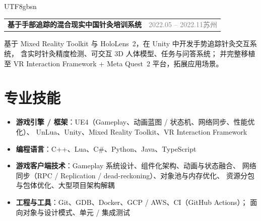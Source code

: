 \documentclass[a4paper, 10.5pt]{article}
\makeatletter
\newcommand{\entryheadsingle}[2]{%
  \noindent
  \begin{tabularx}{\linewidth}{@{}X r@{}}
    \textbf{#1} & \small\textcolor{gray}{#2}
  \end{tabularx}\vspace{1pt}}
\makeatother
\begin{document}
\begin{CJK}{UTF8}{gbsn}
\entryheadsingle{基于手部追踪的混合现实中国针灸培训系统}{2022.05 -- 2022.11\quad 苏州}

\small
基于 Mixed Reality Toolkit 与 HoloLens~2，在 Unity 中开发手势追踪针灸交互系统，
含实时针灸精度检测、可交互 3D 人体模型、任务与问答系统；
并完整移植至 VR Interaction Framework + Meta Quest~2 平台，拓展应用场景。

\section{专业技能}

\small
\begin{itemize}
  \item \textbf{游戏引擎 / 框架}：UE4（Gameplay、动画蓝图 / 状态机、网络同步、性能优化）、
        UnLua、Unity、Mixed Reality Toolkit、VR Interaction Framework
  \item \textbf{编程语言}：C++、Lua、C\#、Python、Java、TypeScript
  \item \textbf{游戏客户端技术}：Gameplay 系统设计、组件化架构、动画与状态融合、
        网络同步（RPC / Replication / dead-reckoning）、对象池与内存优化、
        资源分包与包体优化、大型项目架构解耦
  \item \textbf{工程与工具}：Git、GDB、Docker、GCP / AWS、CI（GitHub Actions）；
        面向对象与设计模式、单元 / 集成测试
\end{itemize}

\end{CJK}
\end{document}
